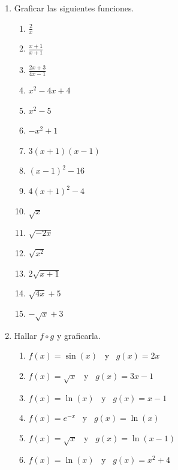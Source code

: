 \documentclass[a4paper]{article}
\newcommand{\exercise}{\item}
\begin{document}
\begin{enumerate}
	\begin{enumerate} [label=(\alph*)]
		\item $2\sin(x)=1$
		\item $3\sin(x)=0$
		\item $4\sin^{2}\left(x-\frac{\pi}{2}\right)=0$
		\item $\sin(x)-\frac{\sqrt{3}}{2}=0$
		\item $2\cos(-x)=\sqrt{2}$
		\item $20\cos(x)+60=-80$
	\end{enumerate}
	\exercise Graficar las siguientes funciones.
	\begin{enumerate} [label=(\alph*)]
		\item $\displaystyle\frac{2}{x}$
		\item $\displaystyle\frac{x+1}{x+1}$
		\item $\displaystyle\frac{2x+3}{4x-1}$
		\item $x^2-4x+4$
		\item $x^2-5$
		\item $-x^2+1$
		\item $3(x+1)(x-1)$
		\item $(x-1)^2-16$
		\item $4(x+1)^2-4$
		\item $\sqrt{x}$
		\item $\sqrt{-2x}$
		\item $\sqrt{x^2}$
		\item $2\sqrt{x+1}$
		\item $\sqrt{4x}+5$
		\item $-\sqrt{x}+3$
	\end{enumerate}
	\exercise Hallar $f \circ g$ y graficarla.
	\begin{enumerate} [label=(\alph*)]
		\item $f(x)=\sin(x)$ ~y~ $g(x)=2x$
		\item $f(x)=\sqrt{x}$ ~y~ $g(x)=3x-1$
		\item $f(x)=\ln(x)$ ~y~ $g(x)=x-1$
		\item $f(x)=\displaystyle{e^{-x}}$ ~y~ $g(x)=\ln(x)$
		\item $f(x)=\sqrt{x}$ ~y~ $g(x)=\ln(x-1)$
		\item $f(x)=\ln(x)$ ~y~ $g(x)=x^2+4$

\end{enumerate}
\end{enumerate}
\end{document}
